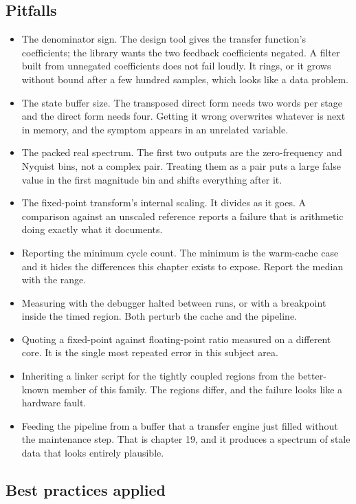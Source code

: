 \subsection*{Pitfalls}

\begin{itemize}
\item The denominator sign. The design tool gives the transfer function's
coefficients; the library wants the two feedback coefficients negated. A filter
built from unnegated coefficients does not fail loudly. It rings, or it grows
without bound after a few hundred samples, which looks like a data problem.
\item The state buffer size. The transposed direct form needs two words per
stage and the direct form needs four. Getting it wrong overwrites whatever is
next in memory, and the symptom appears in an unrelated variable.
\item The packed real spectrum. The first two outputs are the zero-frequency
and Nyquist bins, not a complex pair. Treating them as a pair puts a large
false value in the first magnitude bin and shifts everything after it.
\item The fixed-point transform's internal scaling. It divides as it goes. A
comparison against an unscaled reference reports a failure that is arithmetic
doing exactly what it documents.
\item Reporting the minimum cycle count. The minimum is the warm-cache case and
it hides the differences this chapter exists to expose. Report the median with
the range.
\item Measuring with the debugger halted between runs, or with a breakpoint
inside the timed region. Both perturb the cache and the pipeline.
\item Quoting a fixed-point against floating-point ratio measured on a
different core. It is the single most repeated error in this subject area.
\item Inheriting a linker script for the tightly coupled regions from the
better-known member of this family. The regions differ, and the failure looks
like a hardware fault.
\item Feeding the pipeline from a buffer that a transfer engine just filled
without the maintenance step. That is chapter 19, and it produces a spectrum of
stale data that looks entirely plausible.
\end{itemize}

\subsection*{Best practices applied}


